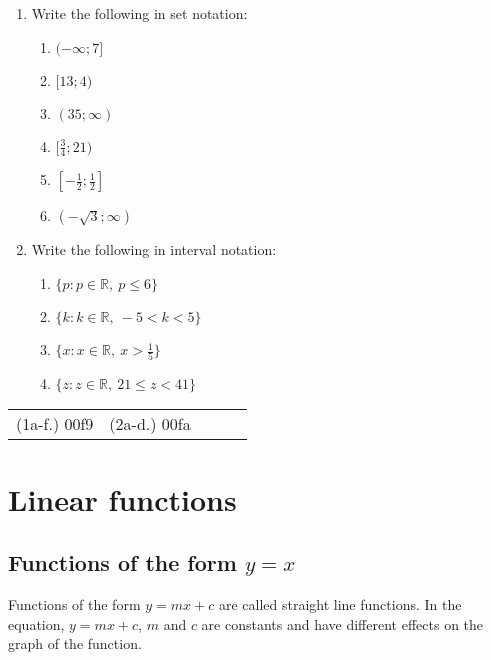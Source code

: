 \begin{exercises}{}
{
\begin{enumerate}[noitemsep, label=\textbf{\arabic*}. ] 
\item Write the following in set notation:
\begin{enumerate}[noitemsep, label=\textbf{(\alph*)} ] 
 \item $(-\infty; 7]$
\item $[13; 4)$
\item $(35; \infty)$
\item $[\frac{3}{4}; 21)$
\item $[-\frac{1}{2}; \frac{1}{2}]$
\item $(-\sqrt{3}; \infty)$
\end{enumerate}

\item Write the following in interval notation:
\begin{enumerate}[noitemsep, label=\textbf{(\alph*)} ] 
 \item $\{p: p \in \mathbb{R},~ p \leq 6\}$
 \item $\{k: k \in \mathbb{R},~ -5 < k < 5\}$
 \item $\{x: x \in \mathbb{R},~ x > \frac{1}{5}\}$
 \item $\{z: z \in \mathbb{R},~ 21 \leq z < 41\}$
\end{enumerate}
\end{enumerate}
\practiceinfo
\par 
\par \begin{tabular}[h]{ccccc}
(1a-f.) 00f9&  (2a-d.) 00fa&  %
\end{tabular}
} 
\end{exercises}


\section{Linear functions}


\subsection*{Functions of the form $y = x$}       
Functions of the form $y=mx+c$ are called straight line functions. In the equation, $y=mx+c$, $m$ and $c$ are constants and have different effects on the graph of the function. 


